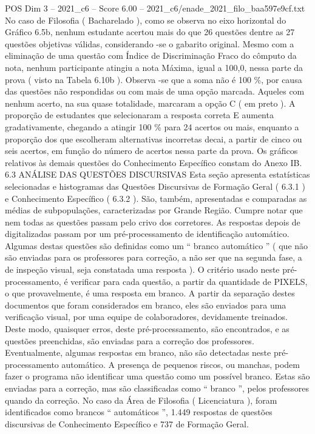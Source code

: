 \begin{textsample}{POS Dim 3 – 2021\_c6 – Score 6.00 – 2021\_c6/enade\_2021\_filo\_baa597e9cf.txt}
No caso de Filosofia ( Bacharelado ), como se observa no eixo horizontal do Gráfico 6.5b, nenhum estudante acertou mais do que 26 questões dentre as 27 questões objetivas válidas, considerando -se o gabarito original.
Mesmo com a eliminação de uma questão com Índice de Discriminação Fraco do cômputo da nota, nenhum participante atingiu a nota Máxima, igual a 100,0, nessa parte da prova ( visto na Tabela 6.10b ).
Observa -se que a soma não é 100 \%, por causa das questões não respondidas ou com mais de uma opção marcada.
Aqueles com nenhum acerto, na sua quase totalidade, marcaram a opção C ( em preto ).
A proporção de estudantes que selecionaram a resposta correta E aumenta gradativamente, chegando a atingir 100 \% para 24 acertos ou mais, enquanto a proporção dos que escolheram alternativas incorretas decai, a partir de cinco ou seis acertos, em função do número de acertos nessa parte da prova.
Os gráficos relativos às demais questões do Conhecimento Específico constam do Anexo IB. 6.3 ANÁLISE DAS QUESTÕES DISCURSIVAS Esta seção apresenta estatísticas selecionadas e histogramas das Questões Discursivas de Formação Geral ( 6.3.1 ) e Conhecimento Específico ( 6.3.2 ).
São, também, apresentadas e comparadas as médias de subpopulações, caracterizadas por Grande Região.
Cumpre notar que nem todas as questões passam pelo crivo dos corretores.
As respostas depois de digitalizadas passam por um pré-processamento de identificação automático.
Algumas destas questões são definidas como um “ branco automático ” ( que não são enviadas para os professores para correção, a não ser que na segunda fase, a de inspeção visual, seja constatada uma resposta ).
O critério usado neste pré-processamento, é verificar para cada questão, a partir da quantidade de PIXELS, o que provavelmente, é uma resposta em branco.
A partir da separação destes documentos que foram considerados em branco, eles são enviados para uma verificação visual, por uma equipe de colaboradores, devidamente treinados.
Deste modo, quaisquer erros, deste pré-processamento, são encontrados, e as questões preenchidas, são enviadas para a correção dos professores.
Eventualmente, algumas respostas em branco, não são detectadas neste pré-processamento automático.
A presença de pequenos riscos, ou manchas, podem fazer o programa não identificar uma questão como um possível branco.
Estas são enviadas para a correção, mas são classificadas como “ branco ”, pelos professores quando da correção.
No caso da Área de Filosofia ( Licenciatura ), foram identificados como brancos “ automáticos ”, 1.449 respostas de questões discursivas de Conhecimento Específico e 737 de Formação Geral.

\end{textsample}
